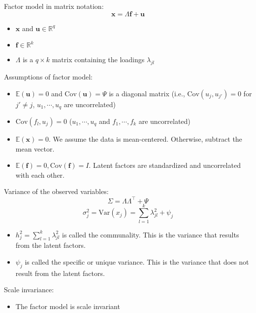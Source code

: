 \documentclass[a4paper]{article}
\begin{document}
Factor model in matrix notation:
\[\mathbf{x}=\Lambda\mathbf{f}+\mathbf{u} \]
\begin{itemize}
    \item $\mathbf{x}$ and $\mathbf{u}\in\mathbb{R}^{q}$
    \item $\mathbf{f}\in\mathbb{R}^{k}$
    \item $\Lambda$ is a $q\times k$ matrix containing the loadings $\lambda_{jl}$
\end{itemize}

Assumptions of factor model:
\begin{itemize}
    \item $\mathbb{E}(\mathbf{u})=0$ and $\text{Cov}(\mathbf{u})=\Psi$ is a diagonal matrix (i.e., $\text{Cov}(u_j,u_{j'})=0$ for $j'\neq j$, $u_1,\cdots, u_q$ are uncorrelated)
    \item $\text{Cov}(f_l,u_j)=0$ ($u_1,\cdots,u_q$ and $f_1,\cdots,f_k$ are uncorrelated)
    \item $\mathbb{E}(\mathbf{x})=0$. We assume the data is mean-centered. Otherwise, subtract the mean vector.
    \item $\mathbb{E}(\mathbf{f})=0, \text{Cov}(\mathbf{f})=I$. Latent factors are standardized and uncorrelated with each other.
\end{itemize}

Variance of the observed variables:
\[\Sigma=\Lambda\Lambda^{\intercal}+\Psi \]
\[\sigma_j^2=\text{Var}(x_j)=\sum_{l=1}^{k}\lambda_{jl}^2+\psi_j \]
\begin{itemize}
    \item $h_j^2=\sum_{l=1}^{k}\lambda_{jl}^2$ is called the communality. This is the variance that results from the latent factors.
    \item $\psi_j$ is called the specific or unique variance. This is the variance that does not result from the latent factors.
\end{itemize}

Scale invariance:
\begin{itemize}
    \item The factor model is scale invariant
\end{itemize}
\end{document}
